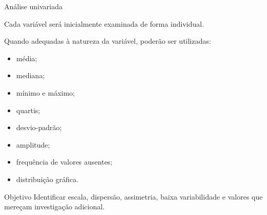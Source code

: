 
\begin{frame}{Análise univariada}

    Cada variável será inicialmente examinada de forma individual.

    \vspace{0.3cm}

    Quando adequadas à natureza da variável, poderão ser utilizadas:

    \begin{itemize}
        \item média;
        \item mediana;
        \item mínimo e máximo;
        \item quartis;
        \item desvio-padrão;
        \item amplitude;
        \item frequência de valores ausentes;
        \item distribuição gráfica.
    \end{itemize}

    \vspace{0.3cm}

    \begin{block}{Objetivo}
        Identificar escala, dispersão, assimetria, baixa variabilidade
        e valores que mereçam investigação adicional.
    \end{block}

\end{frame}



